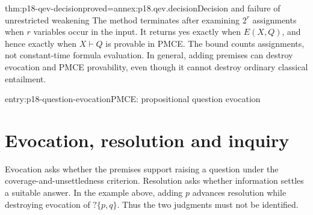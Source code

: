 \begin{hbtheorem}{thm:p18-qev-decision}{proved=annex:p18.qev.decision}{Decision and failure of unrestricted weakening}
The method terminates after examining \(2^r\) assignments when
\(r\) variables occur in the input. It returns yes exactly when
\(E(X,Q)\), and hence exactly when \(X\vdash Q\) is provable
in PMCE. The bound counts assignments, not constant-time formula
evaluation. In general, adding premises can destroy evocation and
PMCE provability, even though it cannot destroy ordinary classical
entailment.
\end{hbtheorem}

\begin{systementry}{entry:p18-question-evocation}{PMCE: propositional question evocation}
\end{systementry}

\section{Evocation, resolution and inquiry}

Evocation asks whether the premises support raising a question under the
coverage-and-unsettledness criterion. Resolution asks whether information
settles a suitable answer. In the example above, adding \(p\) advances
resolution while destroying evocation of \(?\{p,q\}\). Thus the two
judgments must not be identified.

